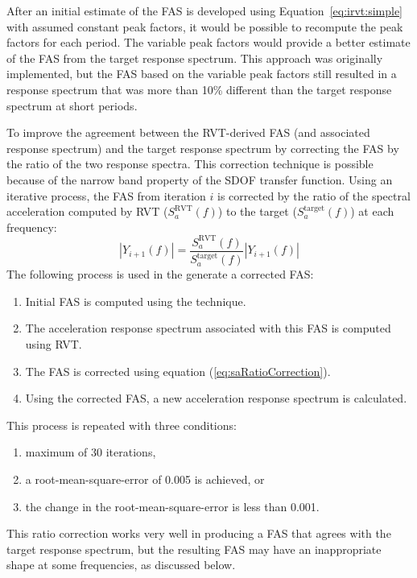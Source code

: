\documentclass[11pt]{report}
\begin{document}
After an initial estimate of the FAS is developed using Equation~\ref{eq:irvt:simple} with assumed
constant peak factors, it would be possible to recompute the peak factors for each period.  The
variable peak factors would provide a better estimate of the FAS from the target response spectrum.
This approach was originally implemented, but the FAS based on the variable peak factors still
resulted in a response spectrum that was more than 10\% different than the target response spectrum
at short periods.

To improve the agreement between the RVT-derived FAS (and associated response spectrum) and the
target response spectrum by correcting the FAS by the ratio of the two response spectra.  This
correction technique is possible because of the narrow band property of the SDOF transfer function.
Using an iterative process, the FAS from iteration $i$ is corrected by the ratio of the spectral
acceleration computed by RVT ($S_{a}^{\text{RVT}}(f)$) to the target
($S_{a}^{\text{target}}(f)$) at each frequency:
\begin{equation}
  |Y_{i+1}(f)| = \frac{S_{a}^{\text{RVT}}(f)}{S_{a}^{\text{target}}(f)} |Y_{i+1}(f)|
  \label{eq:saRatioCorrection}
\end{equation}
The following process is used in the generate a corrected FAS:
\begin{enumerate}
  \item Initial FAS is computed using the \citet{vanmarcke:83} technique.
  \item The acceleration response spectrum associated with this FAS is computed using RVT.
  \item The FAS is corrected using equation (\ref{eq:saRatioCorrection}).
  \item Using the corrected FAS, a new acceleration response spectrum is calculated.
\end{enumerate}
This process is repeated with three conditions:
\begin{enumerate}
  \item maximum of 30 iterations,
  \item a root-mean-square-error of 0.005 is achieved, or
  \item the change in the root-mean-square-error is less than 0.001.
\end{enumerate}
This ratio correction works very well in producing a FAS that agrees with the target response
spectrum, but the resulting FAS may have an inappropriate shape at some frequencies, as discussed
below.
\end{document}
